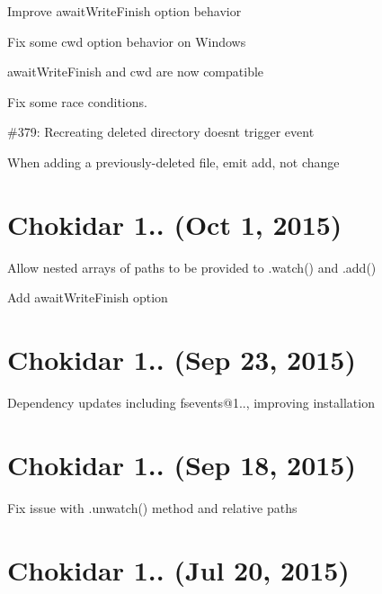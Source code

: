\begin{DoxyItemize}
\item Improve {\ttfamily await\+Write\+Finish} option behavior
\item Fix some {\ttfamily cwd} option behavior on Windows
\item {\ttfamily await\+Write\+Finish} and {\ttfamily cwd} are now compatible
\item Fix some race conditions.
\item \#379\+: Recreating deleted directory doesn\textquotesingle{}t trigger event
\item When adding a previously-\/deleted file, emit \textquotesingle{}add\textquotesingle{}, not \textquotesingle{}change\textquotesingle{}
\end{DoxyItemize}

\section*{Chokidar 1.. (Oct 1, 2015)}


\begin{DoxyItemize}
\item Allow nested arrays of paths to be provided to {\ttfamily .watch()} and {\ttfamily .add()}
\item Add {\ttfamily await\+Write\+Finish} option
\end{DoxyItemize}

\section*{Chokidar 1.. (Sep 23, 2015)}


\begin{DoxyItemize}
\item Dependency updates including fsevents@1.., improving installation
\end{DoxyItemize}

\section*{Chokidar 1.. (Sep 18, 2015)}


\begin{DoxyItemize}
\item Fix issue with {\ttfamily .unwatch()} method and relative paths
\end{DoxyItemize}

\section*{Chokidar 1.. (Jul 20, 2015)}


